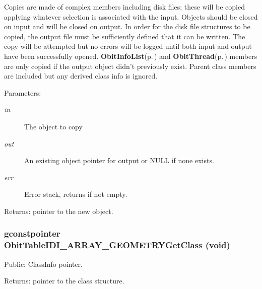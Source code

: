 Copies are made of complex members including disk files; these will be copied applying whatever selection is associated with the input. Objects should be closed on input and will be closed on output. In order for the disk file structures to be copied, the output file must be sufficiently defined that it can be written. The copy will be attempted but no errors will be logged until both input and output have been successfully opened. {\bf Obit\-Info\-List}{\rm (p.\,\pageref{structObitInfoList})} and {\bf Obit\-Thread}{\rm (p.\,\pageref{structObitThread})} members are only copied if the output object didn't previously exist. Parent class members are included but any derived class info is ignored. \begin{Desc}
\item[Parameters:]
\begin{description}
\item[{\em in}]The object to copy \item[{\em out}]An existing object pointer for output or NULL if none exists. \item[{\em err}]Error stack, returns if not empty. \end{description}
\end{Desc}
\begin{Desc}
\item[Returns:]pointer to the new object. \end{Desc}
\subsubsection{\setlength{\rightskip}{0pt plus 5cm}gconstpointer Obit\-Table\-IDI\_\-ARRAY\_\-GEOMETRYGet\-Class (void)}\label{ObitTableIDI__ARRAY__GEOMETRY_8c_a17}


Public: Class\-Info pointer. 

\begin{Desc}
\item[Returns:]pointer to the class structure. \end{Desc}
